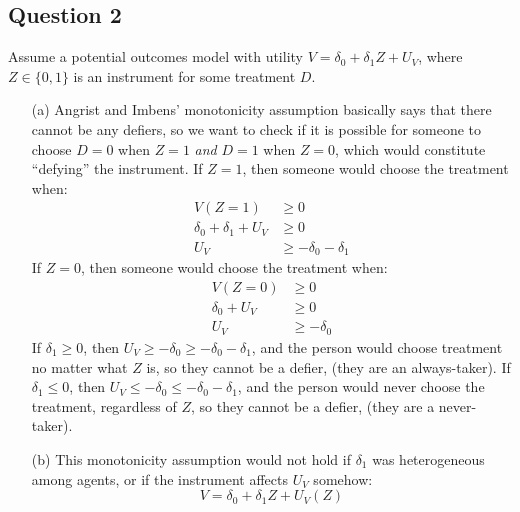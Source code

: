 \documentclass[12pt]{article}
\begin{document}
\subsection*{Question 2}
Assume a potential outcomes model with utility $V = \delta_0 + \delta_1 Z + U_V$, where $Z \in \{0,1\}$ is an instrument for some treatment $D$.  
\begin{enumerate}
    \item[(a)] Angrist and Imbens' monotonicity assumption basically says that there cannot be any defiers, so we want to check if it is possible for someone to choose $D=0$ when $Z=1$ \emph{and} $D=1$ when $Z=0$, which would constitute ``defying'' the instrument. If $Z=1$, then someone would choose the treatment when:
        \begin{align*}
            V(Z = 1) & \geq 0                   \\
            \delta_0 + \delta_1 + U_V & \geq 0  \\
            U_V & \geq - \delta_0 - \delta_1
        \end{align*}
        If $Z=0$, then someone would choose the treatment when:
        \begin{align*}
            V(Z = 0) & \geq 0                   \\
            \delta_0 + U_V & \geq 0             \\
            U_V & \geq - \delta_0 
        \end{align*}
        If $\delta_1 \geq 0$, then $U_V \geq - \delta_0 \geq - \delta_0 - \delta_1$, and the person would choose treatment no matter what $Z$ is, so they cannot be a defier, (they are an always-taker). 
        If $\delta_1 \leq 0$, then $U_V \leq - \delta_0 \leq - \delta_0 - \delta_1$, and the person would never choose the treatment, regardless of $Z$, so they cannot be a defier, (they are a never-taker).
    \item[(b)] This monotonicity assumption would not hold if $\delta_1$ was heterogeneous among agents, or if the instrument affects $U_V$ somehow:
        \[ V = \delta_0 + \delta_1 Z + U_V(Z) \]
\end{enumerate}
\end{document}

